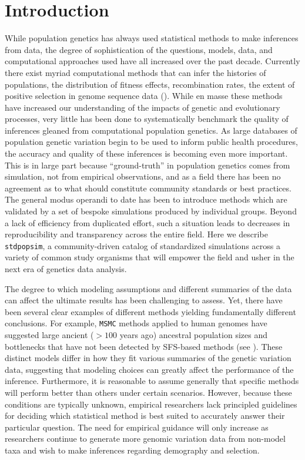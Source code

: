 \documentclass[12pt,halfline,a4paper]{ouparticle}
\newcommand{\stdpopsim}{\texttt{stdpopsim}\xspace}
\newcommand{\MSMC}{\texttt{MSMC}\xspace}
\begin{document}
\section*{Introduction}
While population genetics has always used statistical methods to make inferences from data,
the degree of sophistication of the questions, models, data, and computational approaches
used have all increased over the past decade. Currently there exist myriad computational methods
that can infer the histories of populations, the distribution of fitness effects,
recombination rates, the extent of positive selection in genome sequence data
(\cite{li2011inference,schiffels2014inferring,terhorst2017robust,eyre2009estimating,kim2017inference,
chan2012genome,lin2013fast,Adrion662247,alachiotis2012omegaplus,degiorgio2016sweepfinder2,
kern2018diplos,sugden2018localization}).
While en masse these methods have increased our understanding of the
impacts of genetic and evolutionary processes, very little has been done to systematically
benchmark the quality of inferences gleaned from computational population genetics.
As large databases of population genetic variation begin to be used to inform public health procedures,
the accuracy and quality of these inferences is becoming even more important.
This is in large part because ``ground-truth'' in population genetics comes from simulation,
not from empirical observations, and as a field there has been no agreement as to what should
constitute community standards or best practices. The general modus operandi to date has been to
introduce methods which are validated by a set of bespoke simulations produced by individual
groups. Beyond a lack of efficiency from duplicated effort, such a situation leads
to decreases in reproducibility and transparency across the entire field.
Here we describe \stdpopsim, a community-driven catalog
of standardized simulations across a variety of common study organisms
that will empower the field and usher in the next era of genetics data analysis.

The degree to which modeling assumptions and different summaries of the
data can affect the ultimate results has been challenging to assess. Yet, there
have been several clear examples of different methods yielding fundamentally
different conclusions. For example, \MSMC methods applied to human genomes have
suggested large ancient ($>100$ years ago) ancestral population sizes and
bottlenecks that have not been detected by SFS-based methods (see
\citet{beichman2017comparison}). These distinct models differ in how they fit various summaries of the
genetic variation data, suggesting that modeling choices can greatly affect the
performance of the inference. Furthermore, it is reasonable
to assume generally that specific methods will perform better than others under certain scenarios.
However, because these conditions are typically unknown, empirical researchers
lack principled guidelines for deciding which statistical method is best suited
to accurately answer their particular question. The need for empirical
guidance will only increase as researchers continue to generate more genomic
variation data from non-model taxa and wish to make inferences regarding
demography and selection.
\end{document}
